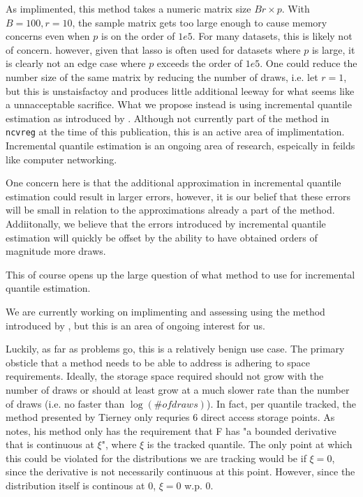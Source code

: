 As implimented, this method takes a numeric matrix size $Br \times p$. With $B = 100, r = 10$, the sample matrix gets too large enough to cause memory concerns even when $p$ is on the order of $1e5$. For many datasets, this is likely not of concern. however, given that lasso is often used for datasets where $p$ is large, it is clearly not an edge case where $p$ exceeds the order of $1e5$. One could reduce the number size of the same matrix by reducing the number of draws, i.e. let $r = 1$, but this is unstaisfactoy and produces little additional leeway for what seems like a unnacceptable sacrifice. What we propose instead is using incremental quantile estimation as introduced by \cite{Tierney1983}. Although not currently part of the method in \texttt{ncvreg} at the time of this publication, this is an active area of implimentation. Incremental quantile estimation is an ongoing area of research, espeically in feilds like computer networking.

One concern here is that the additional approximation in incremental quantile estimation could result in larger errors, however, it is our belief that these errors will be small in relation to the approximations already a part of the method. Addiitonally, we believe that the errors introduced by incremental quantile estimation will quickly be offset by the ability to have obtained orders of magnitude more draws.

This of course opens up the large question of what method to use for incremental quantile estimation.

We are currently working on implimenting and assessing using the method introduced by \cite{Tierney1983}, but this is an area of ongoing interest for us.

Luckily, as far as problems go, this is a relatively benign use case. The primary obsticle that a method needs to be able to address is adhering to space requirements. Ideally, the storage space required should not grow with the number of draws or should at least grow at a much slower rate than the number of draws (i.e. no faster than $\log(\# of draws)$). In fact, per quantile tracked, the method presented by Tierney only requries 6 direct access storage points. As \cite{Tierney1983} notes, his method only has the requirement that F has "a bounded derivative that is continuous at $\xi$", where $\xi$ is the tracked quantile. The only point at which this could be violated for the distributions we are tracking would be if $\xi = 0$, since the derivative is not necessarily continuous at this point. However, since the distribution itself is continous at 0, $\xi = 0$ w.p. 0.

